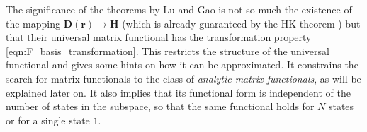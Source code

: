 \documentclass[journal=jpclcd,manuscript=letter]{achemso}
\newcommand\m[1]{\mathbf{#1}}
\renewcommand\vec[1]{\mathbf{#1}}
\begin{document}
The significance of the theorems by Lu and Gao is not so much the existence of the mapping $\m{D}(\vec{r}) \to \m{H}$ (which is already
guaranteed by the HK theorem \cite{Goerling1996density}) but that their
universal matrix functional has the transformation property \ref{eqn:F_basis_transformation}.
This restricts the structure of the universal functional and gives some hints on how it can be approximated.
It constrains the search for matrix functionals to the class of \emph{analytic matrix functionals}, as will be explained later on.
It also implies that its functional form
is independent of the number of states in the subspace, so that the same functional holds for $N$ states or for a single state $1$.
\end{document}
